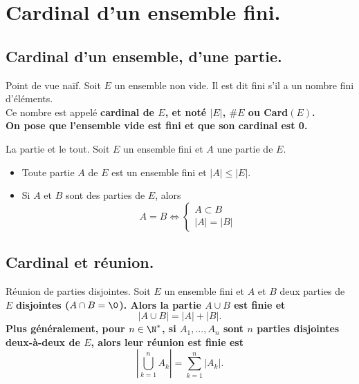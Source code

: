 \documentclass[11pt]{article}
\begin{document}


\thispagestyle{fancy}

\section{Cardinal d'un ensemble fini.}
\subsection{Cardinal d'un ensemble, d'une partie.}

\begin{defi}{Point de vue naïf.}{}
    Soit $E$ un ensemble non vide. Il est dit fini s'il a un nombre fini d'éléments.\\
    Ce nombre est appelé \bf{cardinal} de $E$, et noté $|E|$, $\#E$ ou Card$(E)$.\\
    On pose que l'ensemble vide est fini et que son cardinal est 0.
\end{defi}

\begin{prop}{La partie et le tout.}{}
    Soit $E$ un ensemble fini et $A$ une partie de $E$.
    \begin{itemize}
        \item Toute partie $A$ de $E$ est un ensemble fini et $|A|\leq|E|$.
        \item Si $A$ et $B$ sont des parties de $E$, alors
        \begin{equation*}
            A=B \iff \begin{cases}
                A\subset B\\
                |A|=|B|
            \end{cases}
        \end{equation*}
    \end{itemize}
\end{prop}

\subsection{Cardinal et réunion.}

\begin{prop}{Réunion de parties disjointes.}{}
    Soit $E$ un ensemble fini et $A$ et $B$ deux parties de $E$ \bf{disjointes} ($A\cap B=\0$). Alors la partie $A\cup B$ est finie et
    \begin{equation*}
        |A\cup B| = |A| + |B|.
    \end{equation*}
    Plus généralement, pour $n\in\N^*$, si $A_1,...,A_n$ sont $n$ parties disjointes deux-à-deux de $E$, alors leur réunion est finie est
    \begin{equation*}
        \left|\bigcup_{k=1}^nA_k\right|=\sum_{k=1}^n|A_k|.
    \end{equation*} 
\end{prop}
\end{document}
